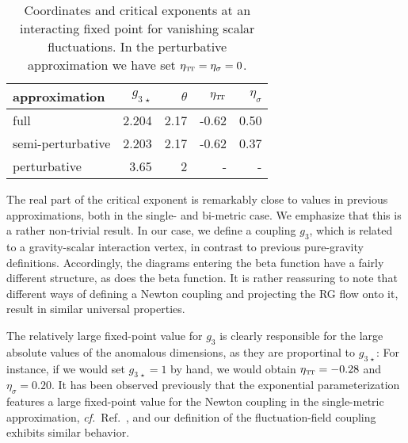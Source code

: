 \documentclass[11pt]{book} %
\newcommand\TTspace{ -1pt }
\newcommand\etaTT{ \eta_{\scriptscriptstyle{\mathrm{T\hspace{\TTspace}T}}} }
\newcommand\cf{\textit{cf.}\ }
\numberwithin{equation}{chapter}
\begin{document}
\begin{table}[]
  \begin{center}
    \begin{tabular}{ l r r r r }
      \toprule
      approximation      & $g_{3\,\star}$ & $\theta$ & $\etaTT$ & $\eta_{\sigma}$ \\
      \midrule
      full               & 2.204         & 2.17     & -0.62           & 0.50 \\
      semi-perturbative  & 2.203         & 2.17     & -0.62           & 0.37 \\
      perturbative       & 3.65          & 2        & -               & -    \\
      \bottomrule
    \end{tabular}
  \end{center}
  \caption[Coordinates and critical exponents of fixed points in perturbative approximation]
  {
    Coordinates and critical exponents at an interacting fixed point for vanishing scalar fluctuations.
    In the perturbative approximation we have set $\etaTT = \eta_{\sigma} = 0$.
  }
  \label{puregravityFP_table}
\end{table}

The real part of the critical exponent is remarkably close to values in previous approximations,
both in the single- and bi-metric case. We emphasize that this is a  rather non-trivial result.
In our case, we define a coupling $g_3$, which is related to a gravity-scalar interaction vertex,
in contrast to previous pure-gravity definitions.
Accordingly, the diagrams entering the beta function have a fairly different structure,
as does the beta function.
It is rather reassuring to note that different ways of defining a Newton coupling and projecting
the RG flow onto it, result in similar universal properties.

The relatively large fixed-point value for $g_3$ is clearly responsible for the large absolute
values of the anomalous dimensions, as they are proportinal to $g_{3\,\star}$: For instance,
if we would set $g_{3\,\star}=1$ by hand, we would obtain $\etaTT = -0.28$ and $\eta_{\sigma} =0.20$.
It has been observed previously that the exponential parameterization features a large fixed-point
value for the Newton coupling in the single-metric approximation, \cf Ref.~\cite{Percacci:2015wwa},
and our definition of the fluctuation-field coupling exhibits similar behavior.
\end{document}
